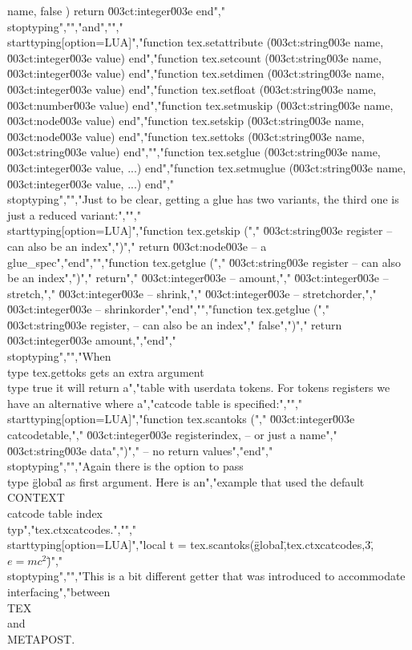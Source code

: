 name, false ) return \u003ct:integer\u003e end","\\stoptyping","","and","","\\starttyping[option=LUA]","function tex.setattribute (\u003ct:string\u003e name, \u003ct:integer\u003e value) end","function tex.setcount     (\u003ct:string\u003e name, \u003ct:integer\u003e value) end","function tex.setdimen     (\u003ct:string\u003e name, \u003ct:integer\u003e value) end","function tex.setfloat     (\u003ct:string\u003e name, \u003ct:number\u003e  value) end","function tex.setmuskip    (\u003ct:string\u003e name, \u003ct:node\u003e value) end","function tex.setskip      (\u003ct:string\u003e name, \u003ct:node\u003e   value) end","function tex.settoks      (\u003ct:string\u003e name, \u003ct:string\u003e  value) end","","function tex.setglue      (\u003ct:string\u003e name, \u003ct:integer\u003e value, ...) end","function tex.setmuglue    (\u003ct:string\u003e name, \u003ct:integer\u003e value, ...) end","\\stoptyping","","Just to be clear, getting a glue has two variants, the third one is just a reduced variant:","","\\starttyping[option=LUA]","function tex.getskip (","    \u003ct:string\u003e register -- can also be an index",")","    return \u003ct:node\u003e -- a glue_spec","end","","function tex.getglue (","    \u003ct:string\u003e  register -- can also be an index",")","    return","        \u003ct:integer\u003e -- amount,","        \u003ct:integer\u003e -- stretch,","        \u003ct:integer\u003e -- shrink,","        \u003ct:integer\u003e -- stretchorder,","        \u003ct:integer\u003e -- shrinkorder","end","","function tex.getglue (","    \u003ct:string\u003e register, -- can also be an index","    false",")","    return \u003ct:integer\u003e amount,","end","\\stoptyping","","When \\type {tex.gettoks} gets an extra argument \\type {true} it will return a","table with userdata tokens. For tokens registers we have an alternative where a","catcode table is specified:","","\\starttyping[option=LUA]","function tex.scantoks (","    \u003ct:integer\u003e catcodetable,","    \u003ct:integer\u003e registerindex, -- or just a name","    \u003ct:string\u003e  data",")","    -- no return values","end","\\stoptyping","","Again there is the option to pass \\type {\"global\"} as first argument. Here is an","example that used the default \\CONTEXT\\ catcode table index \\typ","{tex.ctxcatcodes}.","","\\starttyping[option=LUA]","local t = tex.scantoks(\"global\",tex.ctxcatcodes,3,\"$e=mc^2$\")","\\stoptyping","","This is a bit different getter that was introduced to accommodate interfacing","between \\TEX\\ and \\METAPOST. 